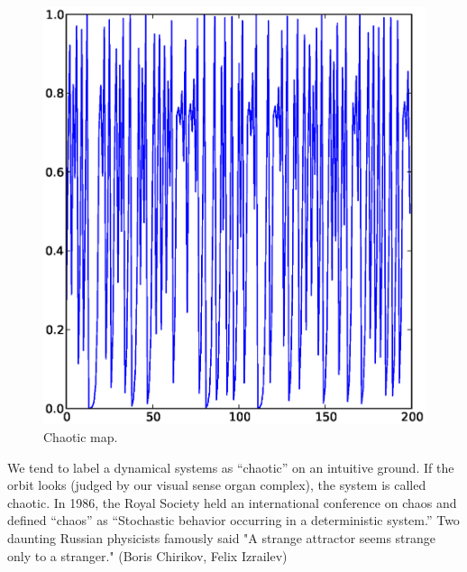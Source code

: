 \documentclass[11pt]{article}
\begin{document}
\begin{figure}[h]
  \begin{center}
    \includegraphics[scale=0.5]{logistic_map_mu4_x02.eps}
  \end{center}
  \caption{
    Chaotic map.
  }
  \label{fig:logistic_map_chaotic}
\end{figure}

We tend to label a dynamical systems as ``chaotic'' on an intuitive ground.
If the orbit looks (judged by our visual sense organ complex), the system is called chaotic.
In 1986, the Royal Society held an international conference on chaos and defined ``chaos'' as ``Stochastic behavior occurring in a deterministic system.'' \cite{stewart}
Two daunting Russian physicists famously said "A strange attractor seems strange only to a stranger."
(Boris Chirikov, Felix Izrailev)\cite{lorenzbook}



\end{document}
